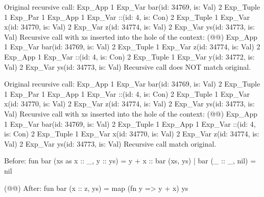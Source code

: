 \begin{example}
\begin{narrow}{-3em}{0em}
\begin{multicols}{2}
\begin{sml}
Original recursive call:
Exp_App
  1 Exp_Var bar(id: 34769, is: Val)
  2 Exp_Tuple
      1 Exp_Par
          1 Exp_App
              1 Exp_Var ::(id: 4, is: Con)
              2 Exp_Tuple
                  1 Exp_Var x(id: 34770, is: Val)
                  2 Exp_Var z(id: 34774, is: Val)
      2 Exp_Var ys(id: 34773, is: Val)
Recursive call with xs inserted into the hole
of the context:
(@@)
Exp_App
  1 Exp_Var bar(id: 34769, is: Val)
  2 Exp_Tuple
      1 Exp_Var z(id: 34774, is: Val)
      2 Exp_App
          1 Exp_Var ::(id: 4, is: Con)
          2 Exp_Tuple
              1 Exp_Var y(id: 34772, is: Val)
              2 Exp_Var ys(id: 34773, is: Val)
Recursive call does NOT match original.

Original recursive call:
Exp_App
  1 Exp_Var bar(id: 34769, is: Val)
  2 Exp_Tuple
      1 Exp_Par
          1 Exp_App
              1 Exp_Var ::(id: 4, is: Con)
              2 Exp_Tuple
                  1 Exp_Var x(id: 34770, is: Val)
                  2 Exp_Var z(id: 34774, is: Val)
      2 Exp_Var ys(id: 34773, is: Val)
Recursive call with xs inserted into the hole
of the context:
(@@)
Exp_App
  1 Exp_Var bar(id: 34769, is: Val)
  2 Exp_Tuple
      1 Exp_App
          1 Exp_Var ::(id: 4, is: Con)
          2 Exp_Tuple
              1 Exp_Var x(id: 34770, is: Val)
              2 Exp_Var z(id: 34774, is: Val)
      2 Exp_Var ys(id: 34773, is: Val)
Recursive call match original.

Before:
fun bar (xs as x :: _, y :: ys) = y + x :: bar (xs, ys)
  | bar (_ :: _, nil) = nil

(@@)
After:
fun bar (x :: z, ys) = map (fn y => y + x) ys
      \end{sml}
    \end{multicols}
  \end{narrow} 
\end{example}

